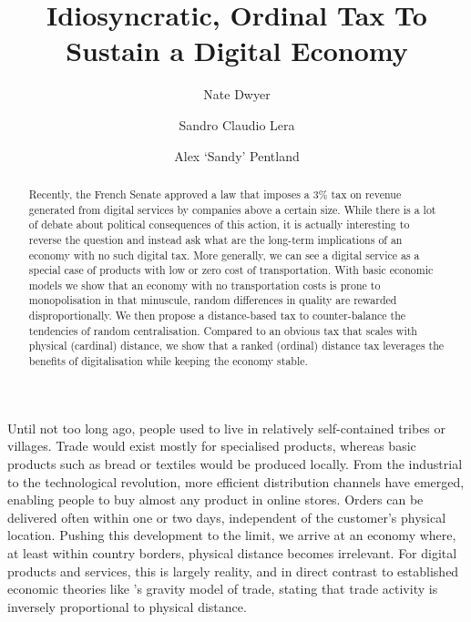 \documentclass[final,5p,times,twocolumn,11pt,authoryear]{elsarticle}
\numberwithin{equation}{section} %
\begin{document}
\begin{frontmatter}

\title{Idiosyncratic, Ordinal Tax To Sustain a Digital Economy}

\author{Nate Dwyer}

\author{Sandro Claudio Lera}

\author{Alex `Sandy' Pentland}

\address{Massachusetts Institute of Technology, 77 Massachusetts Avenue, 02139 Cambridge, Massachusetts, USA}

\begin{abstract}

Recently, the French Senate approved a law that imposes a $3\%$ tax on revenue generated from digital services by companies above a certain size. 
While there is a lot of debate about political consequences of this action, it is actually interesting to reverse the question and instead ask what are the long-term implications of an economy with no such digital tax. 
More generally, we can see a digital service as a special case of products with low or zero cost of transportation. 
With basic economic models we show that an economy with no transportation costs is prone to monopolisation in that minuscule, random differences in quality are rewarded disproportionally. 
We then propose a distance-based tax to counter-balance the tendencies of random centralisation.  
Compared to an obvious tax that scales with physical (cardinal) distance, we show that a ranked (ordinal) distance tax leverages the benefits of digitalisation while keeping the economy stable. 

\end{abstract} 

\end{frontmatter}

Until not too long ago, people used to live in relatively self-contained tribes or villages. 
Trade would exist mostly for specialised products, whereas basic products such as bread or textiles would be produced locally. 
From the industrial to the technological revolution, more efficient distribution channels have emerged, enabling people to buy almost any product in online stores. 
Orders can be delivered often within one or two days, independent of the customer’s physical location. 
Pushing this development to the limit, we arrive at an economy where, at least within country borders, physical distance becomes irrelevant. 
For digital products and services, this is largely reality, and in direct contrast to established economic theories like \cite{Isard1954}'s gravity model of trade, stating that trade activity is inversely proportional to physical distance. 
\end{document}

